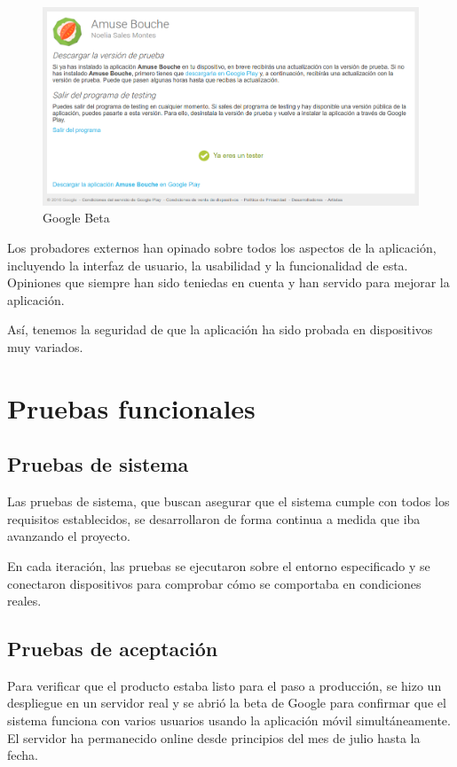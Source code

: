 \begin{figure}[htbp]
  \centering
  \includegraphics[width=\textwidth]{cap7/img/google-beta}
  \caption{Google Beta}
  \label{fig:google-beta}
\end{figure}

Los probadores externos han opinado sobre todos los aspectos de la aplicación,
incluyendo la interfaz de usuario, la usabilidad y la funcionalidad de esta.
Opiniones que siempre han sido teniedas en cuenta y han servido para mejorar
la aplicación.

Así, tenemos la seguridad de que la aplicación ha sido probada en dispositivos
muy variados.


\section{Pruebas funcionales}

\subsection{Pruebas de sistema}

Las pruebas de sistema, que buscan asegurar que el sistema cumple con todos
los requisitos establecidos, se desarrollaron de forma continua a medida que iba
avanzando el proyecto.

En cada iteración, las pruebas se ejecutaron sobre el entorno especificado y se
conectaron dispositivos para comprobar cómo se comportaba en condiciones
reales.

\subsection{Pruebas de aceptación}

Para verificar que el producto estaba listo para el paso a producción, se hizo
un despliegue en un servidor real y se abrió la beta de Google para confirmar
que el sistema funciona con varios usuarios usando la aplicación móvil
simultáneamente. El servidor ha permanecido online desde principios del mes de
julio hasta la fecha.


